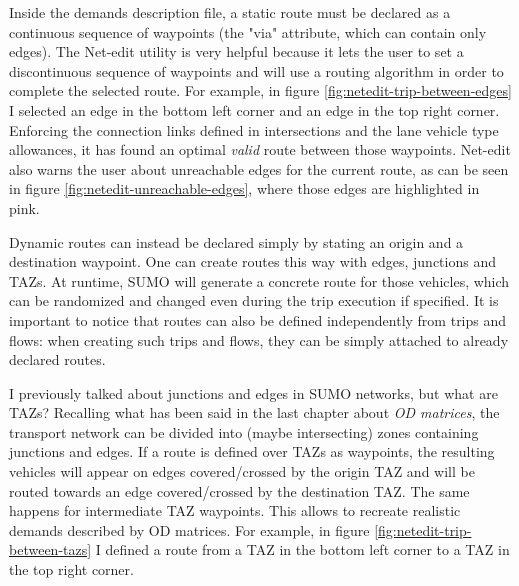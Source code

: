 Inside the demands description file, a static route must be declared as a continuous sequence of waypoints (the "via" attribute, which can contain only edges). The Net-edit utility is very helpful because it lets the user to set a discontinuous sequence of waypoints and will use a routing algorithm in order to complete the selected route. For example, in figure \ref{fig:netedit-trip-between-edges} I selected an edge in the bottom left corner and an edge in the top right corner. Enforcing the connection links defined in intersections and the lane vehicle type allowances, it has found an optimal \textit{valid} route between those waypoints. Net-edit also warns the user about unreachable edges for the current route, as can be seen in figure \ref{fig:netedit-unreachable-edges}, where those edges are highlighted in pink.


Dynamic routes can instead be declared simply by stating an origin and a destination waypoint. One can create routes this way with edges, junctions and TAZs. At runtime, SUMO will generate a concrete route for those vehicles, which can be randomized and changed even during the trip execution if specified. It is important to notice that routes can also be defined independently from trips and flows: when creating such trips and flows, they can be simply attached to already declared routes.

I previously talked about junctions and edges in SUMO networks, but what are TAZs? Recalling what has been said in the last chapter about \textit{OD matrices}, the transport network can be divided into (maybe intersecting) zones containing junctions and edges. If a route is defined over TAZs as waypoints, the resulting vehicles will appear on edges covered/crossed by the origin TAZ and will be routed towards an edge covered/crossed by the destination TAZ. The same happens for intermediate TAZ waypoints. This allows to recreate realistic demands described by OD matrices. For example, in figure \ref{fig:netedit-trip-between-tazs} I defined a route from a TAZ in the bottom left corner to a TAZ in the top right corner.


